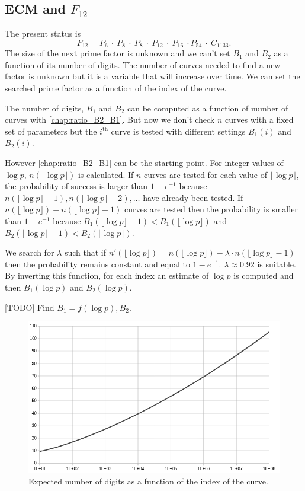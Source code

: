 \documentclass[a4paper, 11pt, pdftex]{report}
\theoremstyle{plain}
\theoremstyle{definition}
\begin{document}
\subsection{ECM and $F_{12}$}

The present status is
$$F_{12} = P_6 \:\cdot\: P_8 \:\cdot\: P_8 \:\cdot\: P_{12} \:\cdot\: P_{16} \:\cdot P_{54}
\:\cdot\: C_{1133}.$$
The size of the next prime factor is unknown and we can't set $B_1$ and $B_2$ as a function
of its number of digits. The number of curves needed to find a new factor is unknown but it
is a variable that will increase over time. We can set the searched prime factor as a function
of the index of the curve.

The number of digits, $B_1$ and $B_2$ can be computed as a function of number of curves
with \autoref{chap:ratio_B2_B1}. But now we don't check $n$ curves with a fixed set of
parameters but the $i^\text{th}$ curve is tested with different settings
$B_1(i)$ and $B_2(i)$.

However \autoref{chap:ratio_B2_B1} can be the starting point. For integer values of $\log p$,
$n(\lfloor\log p\rfloor)$ is calculated. If $n$ curves are tested for each value of
$\lfloor\log p\rfloor$, the probability of success is larger than $1 - e^{-1}$ because
$n(\lfloor\log p\rfloor - 1), n(\lfloor\log p\rfloor - 2), \ldots$ have already been tested.
If $n(\lfloor\log p\rfloor) - n(\lfloor\log p\rfloor - 1)$ curves are tested then
the probability is smaller than $1 - e^{-1}$ because
$B_1(\lfloor\log p\rfloor - 1) < B_1(\lfloor\log p\rfloor)$ and
$B_2(\lfloor\log p\rfloor - 1) < B_2(\lfloor\log p\rfloor)$.

We search for $\lambda$ such that if
$n'(\lfloor\log p\rfloor) = n(\lfloor\log p\rfloor) - \lambda \cdot n(\lfloor\log p\rfloor - 1)$
then the probability remains constant and equal to $1 - e^{-1}$. $\lambda \approx 0.92$ is
suitable. By inverting this function, for each index an estimate of $\log p$ is computed and
then $B_1(\log p)$ and $B_2(\log p)$.

[TODO] Find $B_1 = f(\log p), B_2$. 

\begin{figure}[!ht]
	\vspace*{0.0cm}
	\centering
	\includegraphics[width=15.5cm, angle=0]{img/digits_n.png}
	\caption{\label{fig:dgt_n} Expected number of digits as a function of the index of the curve.}
	\vspace*{1.0cm}
\end{figure}
\end{document}

